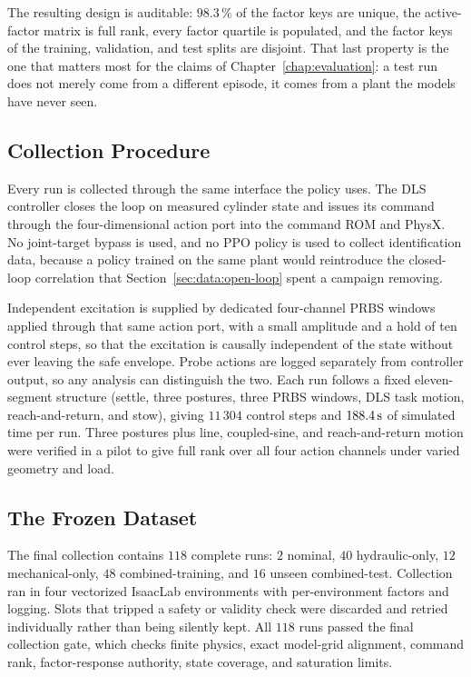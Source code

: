 The resulting design is auditable: $98.3\,\%$ of the factor keys are
unique, the active-factor matrix is full rank, every factor quartile is
populated, and the factor keys of the training, validation, and test
splits are disjoint. That last property is the one that matters most for
the claims of Chapter~\ref{chap:evaluation}: a test run does not merely
come from a different episode, it comes from a plant the models have
never seen.

\subsection{Collection Procedure}

Every run is collected through the same interface the policy uses. The
DLS controller closes the loop on measured cylinder state and issues its
command through the four-dimensional action port into the command ROM
and PhysX. No joint-target bypass is used, and no PPO policy is used to
collect identification data, because a policy trained on the same plant
would reintroduce the closed-loop correlation that
Section~\ref{sec:data:open-loop} spent a campaign removing.

Independent excitation is supplied by dedicated four-channel PRBS
windows applied through that same action port, with a small amplitude
and a hold of ten control steps, so that the excitation is causally
independent of the state without ever leaving the safe envelope. Probe
actions are logged separately from controller output, so any analysis
can distinguish the two. Each run follows a fixed eleven-segment structure
(settle, three postures, three PRBS windows, DLS task motion,
reach-and-return, and stow), giving $11\,304$ control steps
and $\unit[188.4]{s}$ of simulated time per run. Three postures plus
line, coupled-sine, and reach-and-return motion were verified in a pilot
to give full rank over all four action channels under varied geometry
and load.

\subsection{The Frozen Dataset}

The final collection contains $118$ complete runs: $2$ nominal, $40$
hydraulic-only, $12$ mechanical-only, $48$ combined-training, and $16$
unseen combined-test. Collection ran in four vectorized IsaacLab
environments with per-environment factors and logging. Slots that
tripped a safety or validity check were discarded and retried
individually rather than being silently kept. All $118$ runs passed the
final collection gate, which checks finite physics, exact model-grid
alignment, command rank, factor-response authority, state coverage, and
saturation limits.

